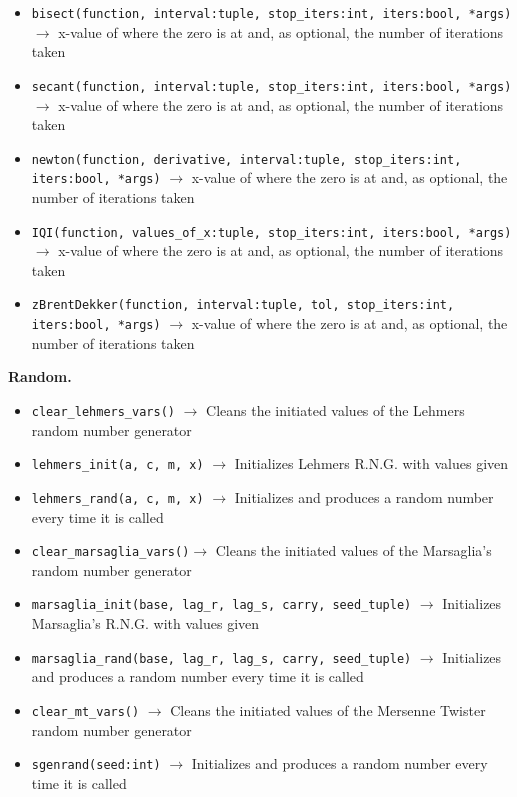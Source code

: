 \begin{itemize}
\item \texttt{bisect(function, interval:tuple, stop\_iters:int, iters:bool, *args)} $\rightarrow$ x-value of where the zero is at and, as optional, the number of iterations taken
\item \texttt{secant(function, interval:tuple, stop\_iters:int, iters:bool, *args)} $\rightarrow$ x-value of where the zero is at and, as optional, the number of iterations taken
\item \texttt{newton(function, derivative, interval:tuple, stop\_iters:int, iters:bool, *args)} $\rightarrow$ x-value of where the zero is at and, as optional, the number of iterations taken
\item \texttt{IQI(function, values\_of\_x:tuple, stop\_iters:int, iters:bool, *args)} $\rightarrow$ x-value of where the zero is at and, as optional, the number of iterations taken
\item \texttt{zBrentDekker(function, interval:tuple, tol, stop\_iters:int, iters:bool, *args)} $\rightarrow$ x-value of where the zero is at and, as optional, the number of iterations taken
\end{itemize}

\textbf{Random.}
\begin{itemize}
\item \texttt{clear\_lehmers\_vars()} $\rightarrow$ Cleans the initiated values of the Lehmers random number generator
\item \texttt{lehmers\_init(a, c, m, x)} $\rightarrow$ Initializes Lehmers R.N.G. with values given
\item \texttt{lehmers\_rand(a, c, m, x)} $\rightarrow$ Initializes and produces a random number every time it is called
\item \texttt{clear\_marsaglia\_vars()}$\rightarrow$ Cleans the initiated values of the Marsaglia's random number generator
\item \texttt{marsaglia\_init(base, lag\_r, lag\_s, carry, seed\_tuple)} $\rightarrow$ Initializes Marsaglia's R.N.G. with values given
\item \texttt{marsaglia\_rand(base, lag\_r, lag\_s, carry, seed\_tuple)} $\rightarrow$ Initializes and produces a random number every time it is called
\item \texttt{clear\_mt\_vars()} $\rightarrow$ Cleans the initiated values of the Mersenne Twister random number generator
\item \texttt{sgenrand(seed:int)} $\rightarrow$ Initializes and produces a random number every time it is called
\end{itemize}

